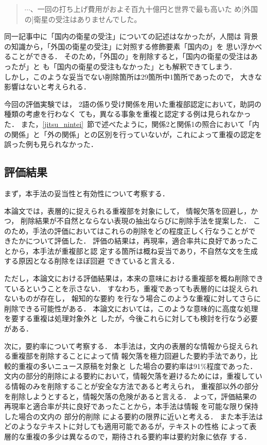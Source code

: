 \begin{itemize}
\begin{quote}
	$\cdots$、一回の打ち上げ費用がおよそ百九十億円と世界で最も高いた
	め[外国の]衛星の受注はありませんでした。
       \end{quote}\vspace{5mm}
       同一記事中に「国内の衛星の受注」についての記述はなかったが，人間は
       背景の知識から，「外国の衛星の受注」に対照する修飾要素「国内の」を
       思い浮かべることができる．
       そのため，「外国の」を削除すると，「国内の衛星の受注はあったが」と
       も「国内の衛星の受注もなかった」とも解釈できてしまう．\\
       しかし，このような妥当でない削除箇所は29箇所中1箇所であったので，
       大きな影響はないと考えられる．
\end{itemize}

今回の評価実験では，
2語の係り受け関係を用いた重複部認定において，助詞の種類の考慮を行わなく
ても，異なる事象を重複と認定する例は見られなかった．
また，\ref{jitsu_nintei}~節で述べたように，関係2と関係1の照合において「内
の関係」と「外の関係」との区別を行っていないが，これによって重複の認定を
誤った例も見られなかった．


\subsection{評価結果} \label{kousatus_zentai}

まず，本手法の妥当性と有効性について考察する．

本論文では，表層的に捉えられる重複部を対象にして，
情報欠落を回避し，かつ，
削除結果が不自然とならない表現の抽出ならびに削除手法を提案した．
このため，手法の評価においてはこれらの削除をどの程度正しく行なうことがで
きたかについて評価した．
評価の結果は，再現率，適合率共に良好であったことから，本手法が重複部と認
定する箇所は概ね妥当であり，不自然な文を生成する原因となる削除をほぼ回避
できていると言える．

ただし，本論文における評価結果は，本来の意味における重複部を概ね削除でき
ているということを示さない．
すなわち，重複であっても表層的には捉えられないものが存在し，
報知的な要約   
を行なう場合このような重複に対してさらに削除できる可能性がある．
本論文においては，このような意味的に高度な処理を要する重複は処理対象外と
したが，今後これらに対しても検討を行なう必要がある．

\vspace{1.5ex}

次に，要約率について考察する．
本手法は，文内の表層的な情報から捉えられる重複部を削除することによって情
報欠落を極力回避した要約手法であり，比較的重複の多いニュース原稿を対象と
した場合の要約率は91\%程度であった．
文内の部分的削除による要約において，情報欠落を避けるためには，重複してい
る情報のみを削除することが安全な方法であると考えられ，
重複部以外の部分を削除しようとすると，情報欠落の危険があると言える．
よって，評価結果の再現率と適合率が共に良好であったことから，本手法は情報
を可能な限り保持した場合の文内の
部分的削除        
による要約の限界に近いと考える．
また本手法はどのようなテキストに対しても適用可能であるが，テキストの性格
によって表層的な重複の多少は異なるので，期待される要約率は要約対象に依存
する．

